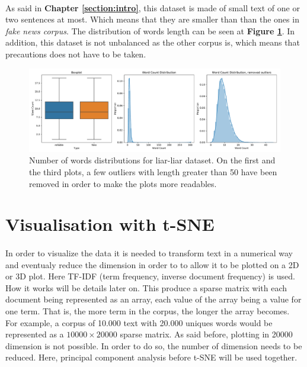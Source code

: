 \paragraph{} As said in \textbf{Chapter \ref{section:intro}}, this dataset is made of small text of one or two sentences at most. Which means that they are smaller than than the ones in \textit{fake news corpus}. The distribution of words length can be seen at \textbf{Figure \ref{fig:data_explo:summary3}}. In addition, this dataset is not unbalanced as the other corpus is, which means that precautions does not have to be taken. 
\begin{figure}[h]
  \centering
  \includegraphics[width=\textwidth]{images/data_exploration/liar_liar_summary.pdf}
  \caption{Number of words distributions for liar-liar dataset. On the first and the third plots, a few outliers with length greater than 50 have been removed in order to make the plots more readables.}
  \label{fig:data_explo:summary3}
\end{figure}

\section{Visualisation with t-SNE}
\paragraph{} In order to visualize the data it is needed to transform text in a numerical way and eventualy reduce the dimension in order to to allow it to be plotted on a 2D or 3D plot. Here TF-IDF (term frequency, inverse document frequency\cite{Robertson2004,Jones2004}) is used. How it works will be details later on. This produce a sparse matrix with each document being represented as an array, each value of the array being a value for one term. That is, the more term in the corpus, the longer the array becomes. For example, a corpus of 10.000 text with 20.000 uniques words would be represented as a $10000 \times 20000$ sparse matrix. As said before, plotting in 20000 dimension is not possible. In order to do so, the number of dimension needs to be reduced. Here, principal component analysis before t-SNE\cite{Maaten2008} will be used together. 

